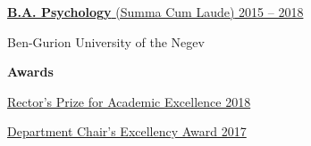 \documentclass[
	12pt,a4paper %
]{article}
\begin{document}
\noindent\dotfill %

\noindent\href{https://loona-il.000webhostapp.com/resume-references/BA-and-honorary.pdf}{\large \noindent\textbf{B.A. Psychology} \normalsize{(Summa Cum Laude)} \hfill 2015 -- 2018}

\noindent Ben-Gurion University of the Negev

\noindent\textbf{Awards}

\href{https://loona-il.000webhostapp.com/resume-references/BA-and-honorary.pdf}{Rector’s Prize for Academic Excellence \hfill 2018}

\href{https://loona-il.000webhostapp.com/resume-references/BA-and-honorary.pdf}{Department Chair’s Excellency Award \hfill 2017}
\end{document}
